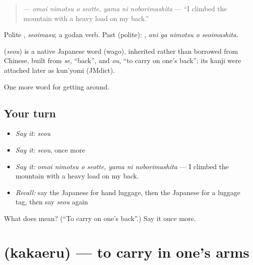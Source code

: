 \begin{quote}
\textbf{   } — \emph{omoi nimotsu o seotte, yama ni noborimashita} — \textquotedblleft{}I climbed the mountain with a heavy load on my back.\textquotedblright{}
\end{quote}

Polite \textbf{}, \emph{seoimasu}; a godan verb. Past (polite): \textbf{  }, \emph{ani ga nimotsu o seoimashita}.

\begin{cousinweb}
\textbf{} (\emph{seou}) is a native Japanese word (wago), inherited rather than borrowed from Chinese, built from \emph{se}, \textquotedblleft{}back\textquotedblright{}, and \emph{ou}, \textquotedblleft{}to carry on one's back\textquotedblright{}; its kanji were attached later as kun'yomi (JMdict).
\end{cousinweb}

\begin{grammarlens}[title={What you've built}]
One more word for getting around.
\end{grammarlens}

\subsection*{Your turn}
\begin{itemize}
\raggedright
  \item \emph{Say it:} \emph{seou}
  \item \emph{Say it:} \emph{seou}, once more
  \item \emph{Say it:} \emph{omoi nimotsu o seotte, yama ni noborimashita} — I climbed the mountain with a heavy load on my back.
  \item \emph{Recall:} say the Japanese for hand luggage, then the Japanese for a luggage tag, then say \emph{seou} again
\end{itemize}

\begin{tcolorbox}[breakable,colback=teal!4,colframe=teal!35!black,title={Before you move on}]
What does  mean? (\textquotedblleft{}To carry on one's back\textquotedblright{}.) Say it once more.
\end{tcolorbox}
\section[\texorpdfstring{\ja{かかえる} (kakaeru)}{かかえる (kakaeru)}]{ (kakaeru) — to carry in one's arms}

